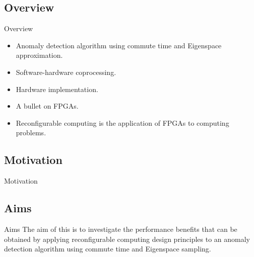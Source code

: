 \subsection{Overview}
\begin{frame}{Overview}
    \begin{itemize}
        \item Anomaly detection algorithm using commute time and Eigenspace
            approximation.
        \item Software-hardware coprocessing.
        \item Hardware implementation.
        \item A bullet on FPGAs.
        \item Reconfigurable computing is the application of FPGAs to computing problems.
    \end{itemize}
\end{frame}

\subsection{Motivation}
\begin{frame}{Motivation}
\end{frame}

\subsection{Aims}
\begin{frame}{Aims}
    The aim of this \thesis{} is to investigate the performance benefits that
    can be obtained by applying reconfigurable computing design principles to an
    anomaly detection algorithm using commute time and Eigenspace sampling.
\end{frame}

